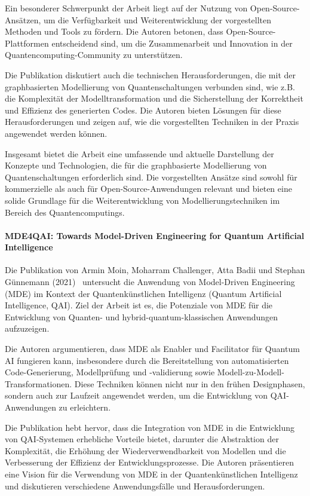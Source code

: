 Ein besonderer Schwerpunkt der Arbeit liegt auf der Nutzung von Open-Source-Ansätzen, um die Verfügbarkeit und 
Weiterentwicklung der vorgestellten Methoden und Tools zu fördern. Die Autoren betonen, dass Open-Source-Plattformen 
entscheidend sind, um die Zusammenarbeit und Innovation in der Quantencomputing-Community zu unterstützen.

Die Publikation diskutiert auch die technischen Herausforderungen, die mit der graphbasierten Modellierung von 
Quantenschaltungen verbunden sind, wie z.B. die Komplexität der Modelltransformation und die Sicherstellung der 
Korrektheit und Effizienz des generierten Codes. Die Autoren bieten Lösungen für diese Herausforderungen und zeigen 
auf, wie die vorgestellten Techniken in der Praxis angewendet werden können.

Insgesamt bietet die Arbeit eine umfassende und aktuelle Darstellung der Konzepte und Technologien, die für die 
graphbasierte Modellierung von Quantenschaltungen erforderlich sind. Die vorgestellten Ansätze sind sowohl für 
kommerzielle als auch für Open-Source-Anwendungen relevant und bieten eine solide Grundlage für die Weiterentwicklung 
von Modellierungstechniken im Bereich des Quantencomputings.

\paragraph{MDE4QAI: Towards Model-Driven Engineering for Quantum Artificial Intelligence}

Die Publikation von Armin Moin, Moharram Challenger, Atta Badii und Stephan Günnemann (2021)~\cite{moin2021mde4qai} untersucht die Anwendung 
von Model-Driven Engineering (MDE) im Kontext der Quantenkünstlichen Intelligenz (Quantum Artificial Intelligence, QAI). 
Ziel der Arbeit ist es, die Potenziale von MDE für die Entwicklung von Quanten- und hybrid-quantum-klassischen Anwendungen aufzuzeigen.

Die Autoren argumentieren, dass MDE als Enabler und Facilitator für Quantum AI fungieren kann, insbesondere durch 
die Bereitstellung von automatisierten Code-Generierung, Modellprüfung und -validierung sowie Modell-zu-Modell-Transformationen. 
Diese Techniken können nicht nur in den frühen Designphasen, sondern auch zur Laufzeit angewendet werden, um die Entwicklung von QAI-Anwendungen zu erleichtern.

Die Publikation hebt hervor, dass die Integration von MDE in die Entwicklung von QAI-Systemen erhebliche Vorteile 
bietet, darunter die Abstraktion der Komplexität, die Erhöhung der Wiederverwendbarkeit von Modellen und die 
Verbesserung der Effizienz der Entwicklungsprozesse. Die Autoren präsentieren eine Vision für die Verwendung von 
MDE in der Quantenkünstlichen Intelligenz und diskutieren verschiedene Anwendungsfälle und Herausforderungen.

